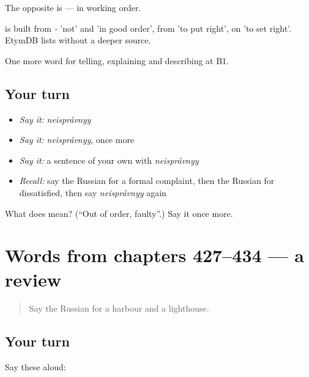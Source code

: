 The opposite is \emph{} — in working order.

\begin{cousinweb}
\emph{} is built from \emph{-} 'not' and \emph{} 'in good order', from \emph{} 'to put right', on \emph{} 'to set right'. EtymDB lists \emph{} without a deeper source.
\end{cousinweb}

\begin{grammarlens}[title={What you've built}]
One more word for telling, explaining and describing at B1.
\end{grammarlens}

\subsection*{Your turn}
\begin{itemize}
\raggedright
  \item \emph{Say it:} \emph{neisprávnyy}
  \item \emph{Say it:} \emph{neisprávnyy}, once more
  \item \emph{Say it:} a sentence of your own with \emph{neisprávnyy}
  \item \emph{Recall:} say the Russian for a formal complaint, then the Russian for dissatisfied, then say \emph{neisprávnyy} again
\end{itemize}

\begin{tcolorbox}[breakable,colback=teal!4,colframe=teal!35!black,title={Before you move on}]
What does  mean? (\textquotedblleft{}Out of order, faulty\textquotedblright{}.) Say it once more.
\end{tcolorbox}
\section[(dialogue)]{Words from chapters 427–434 — a review}

\label{lesson:RU-R434-review-427-434}



\begin{quote}
Say the Russian for a harbour and a lighthouse.
\end{quote}

\subsection*{Your turn}
Say these aloud:

